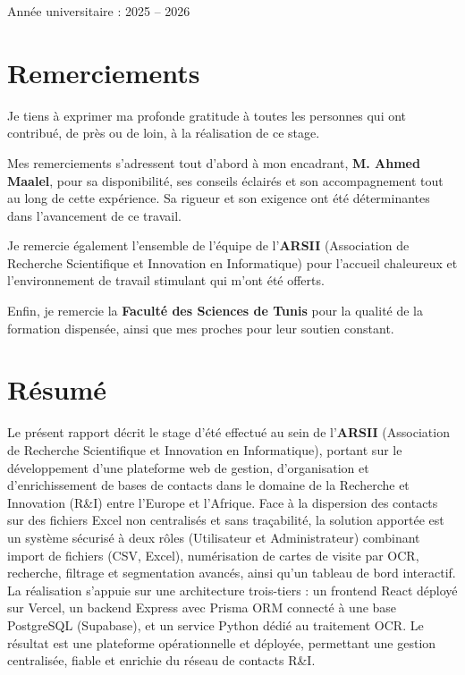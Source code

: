 \documentclass[12pt,a4paper]{report}
\begin{document}
\begin{titlepage}
    \vfill

    {\large Année universitaire : 2025 -- 2026}

\end{titlepage}

\chapter*{Remerciements}

Je tiens à exprimer ma profonde gratitude à toutes les personnes qui ont contribué, de près ou de loin, à la réalisation de ce stage.

Mes remerciements s'adressent tout d'abord à mon encadrant, \textbf{M. Ahmed Maalel}, pour sa disponibilité, ses conseils éclairés et son accompagnement tout au long de cette expérience. Sa rigueur et son exigence ont été déterminantes dans l'avancement de ce travail.

Je remercie également l'ensemble de l'équipe de l'\textbf{ARSII} (Association de Recherche Scientifique et Innovation en Informatique) pour l'accueil chaleureux et l'environnement de travail stimulant qui m'ont été offerts.

Enfin, je remercie la \textbf{Faculté des Sciences de Tunis} pour la qualité de la formation dispensée, ainsi que mes proches pour leur soutien constant.

\chapter*{Résumé}

Le présent rapport décrit le stage d'été effectué au sein de l'\textbf{ARSII} (Association de Recherche Scientifique et Innovation en Informatique), portant sur le développement d'une plateforme web de gestion, d'organisation et d'enrichissement de bases de contacts dans le domaine de la Recherche et Innovation (R\&I) entre l'Europe et l'Afrique. Face à la dispersion des contacts sur des fichiers Excel non centralisés et sans traçabilité, la solution apportée est un système sécurisé à deux rôles (Utilisateur et Administrateur) combinant import de fichiers (CSV, Excel), numérisation de cartes de visite par \acf{OCR}, recherche, filtrage et segmentation avancés, ainsi qu'un tableau de bord interactif. La réalisation s'appuie sur une architecture trois-tiers : un frontend React déployé sur Vercel, un backend Express avec Prisma ORM connecté à une base PostgreSQL (Supabase), et un service Python dédié au traitement OCR. Le résultat est une plateforme opérationnelle et déployée, permettant une gestion centralisée, fiable et enrichie du réseau de contacts R\&I.
\end{document}
